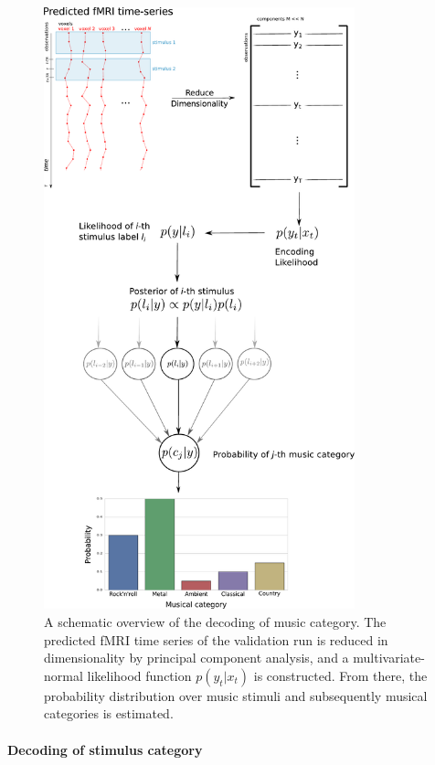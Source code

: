 \begin{figure}
  \centering
  \includegraphics[width=9cm]{pics/Decoding_scheme}

  \caption{A schematic overview of the decoding of music category. The
    predicted f{MRI} time series of the validation run is reduced in
    dimensionality by principal component analysis, and a multivariate-normal
    likelihood function $p(y_{t}|x_{t})$ is constructed.  From there, the
  probability distribution over music stimuli and subsequently musical
categories is estimated.}

 \label{fig:decoding_scheme}
\end{figure}


\paragraph{Decoding of stimulus category}

